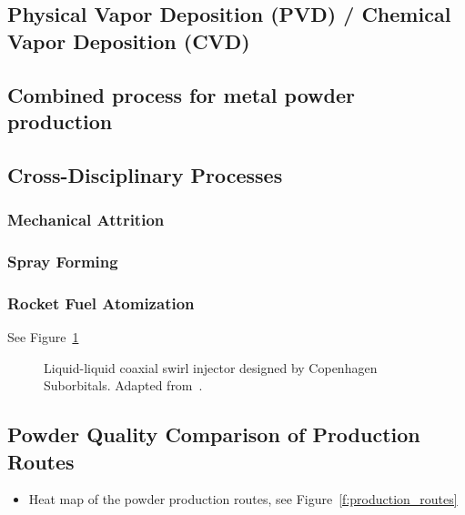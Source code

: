 \documentclass[final,5p,times,twocolumn]{elsarticle}
\begin{document}
\subsection{Physical Vapor Deposition (PVD) / Chemical Vapor Deposition (CVD)}
\label{s:PVD_CVD}

\subsection{Combined process for metal powder production}
\label{s:Combined_Process}

\subsection{Cross-Disciplinary Processes}
\label{s:Cross_Disciplinary}

\subsubsection{Mechanical Attrition}
\label{s:Mechanical_Attrition}

\subsubsection{Spray Forming}
\label{s:Spray_Forming}

\subsubsection{Rocket Fuel Atomization}
\label{s:Rocket_Fuel_Atomization}

See Figure~\ref{f:coaxial_swirl}

\begin{figure}
    \centering
        
        \caption{Liquid-liquid coaxial swirl injector designed by Copenhagen Suborbitals. Adapted from~\cite{CopenhagenSuborbitals}.}
        \label{f:coaxial_swirl}
\end{figure}

\subsection{Powder Quality Comparison of Production Routes}
\label{s:Powder_Quality_Comparison}

\begin{itemize}
  \item Heat map of the powder production routes, see Figure~\ref{f:production_routes}
\end{itemize}
\end{document}
